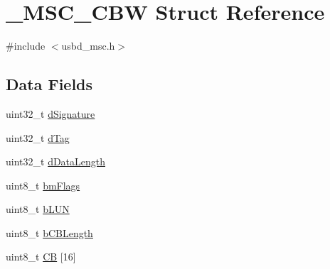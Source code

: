 \hypertarget{struct__MSC__CBW}{\section{\-\_\-\-M\-S\-C\-\_\-\-C\-B\-W Struct Reference}
\label{struct__MSC__CBW}
}


{\ttfamily \#include $<$usbd\-\_\-msc.\-h$>$}

\subsection*{Data Fields}
\begin{DoxyCompactItemize}
\item 
uint32\-\_\-t \hyperlink{struct__MSC__CBW_a1fa625c9bfe68afb30fe973585627c38}{d\-Signature}
\item 
uint32\-\_\-t \hyperlink{struct__MSC__CBW_a2bc3d8d87456e730b569f155a013fbda}{d\-Tag}
\item 
uint32\-\_\-t \hyperlink{struct__MSC__CBW_af35538f5f1b08d48b3f11f5cb3c858ca}{d\-Data\-Length}
\item 
uint8\-\_\-t \hyperlink{struct__MSC__CBW_a57c100a025722a6f5a30c49035e5a23f}{bm\-Flags}
\item 
uint8\-\_\-t \hyperlink{struct__MSC__CBW_aa6b62e68b9e2b63792ab904e2f090107}{b\-L\-U\-N}
\item 
uint8\-\_\-t \hyperlink{struct__MSC__CBW_a2b867486ab4560cb4a6af62289415400}{b\-C\-B\-Length}
\item 
uint8\-\_\-t \hyperlink{struct__MSC__CBW_a9a89704eaaa2b7079085ecd40a908fe7}{C\-B} \mbox{[}16\mbox{]}
\end{DoxyCompactItemize}


